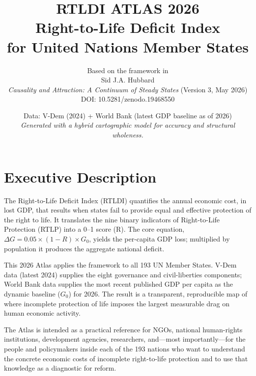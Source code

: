\documentclass[11pt,a4paper]{book}
\begin{document}
\frontmatter
\title{\textbf{\Huge RTLDI ATLAS 2026}\\[0.5cm]
\Large Right-to-Life Deficit Index\\[0.3cm]
\large for United Nations Member States}
\author{Based on the framework in\\[0.2cm]
Sid J.A. Hubbard\\
\textit{Causality and Attraction: A Continuum of Steady States} (Version 3, May 2026)\\
DOI: 10.5281/zenodo.19468550}
\date{Data: V-Dem (2024) + World Bank (latest GDP baseline as of 2026)\\[0.3cm]
\textit{Generated with a hybrid cartographic model for accuracy and structural wholeness.}}

\maketitle

\tableofcontents


\chapter*{Executive Description}

The Right-to-Life Deficit Index (RTLDI) quantifies the annual economic cost, in lost GDP, that results when states fail to provide equal and effective protection of the right to life. It translates the nine binary indicators of Right-to-Life Protection (RTLP) into a 0–1 score (R). The core equation, $\Delta G = 0.05 \times (1 - R) \times G_0$, yields the per-capita GDP loss; multiplied by population it produces the aggregate national deficit.

This 2026 Atlas applies the framework to all 193 UN Member States. V-Dem data (latest 2024) supplies the eight governance and civil-liberties components; World Bank data supplies the most recent published GDP per capita as the dynamic baseline ($G_0$) for 2026. The result is a transparent, reproducible map of where incomplete protection of life imposes the largest measurable drag on human economic activity.

The Atlas is intended as a practical reference for NGOs, national human-rights institutions, development agencies, researchers, and—most importantly—for the people and policymakers inside each of the 193 nations who want to understand the concrete economic costs of incomplete right-to-life protection and to use that knowledge as a diagnostic for reform.
\end{document}
